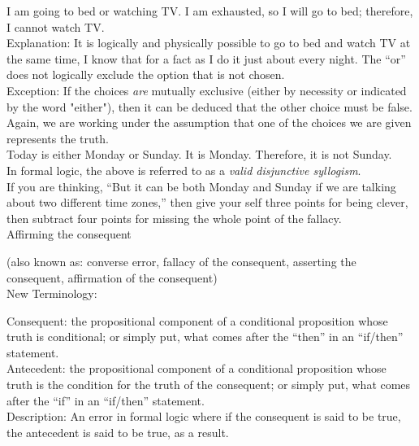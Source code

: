 \documentclass[a4paper,12pt,single,pdftex]{scrartcl}
\begin{document}
    
      I am going to bed or watching TV.  I am exhausted, so I will go to bed; therefore, I cannot watch TV.
    \\

    
      Explanation: It is logically and physically possible to go to bed and watch TV at the same time, I know that for a fact as I do it just about every night.  The “or” does not logically exclude the option that is not chosen.
    \\

    
      Exception: If the choices {\it are} mutually exclusive (either by necessity or indicated by the word "either"), then it can be deduced that the other choice must be false.  Again, we are working under the assumption that one of the choices we are given represents the truth.
    \\

    
      Today is either Monday or Sunday.  It is Monday.  Therefore, it is not Sunday.
    \\

    
      In formal logic, the above is referred to as a {\it valid disjunctive syllogism}.
    \\

    
      If you are thinking, “But it can be both Monday and Sunday if we are talking about two different time zones,” then give your self three points for being clever, then subtract four points for missing the whole point of the fallacy.
    \\

  

Affirming the consequent
    
      (also known as: converse error, fallacy of the consequent, asserting the consequent, affirmation of the consequent)
    \\

  
    New Terminology:

    
      Consequent: the propositional component of a conditional proposition whose truth is conditional; or simply put, what comes after the “then” in an “if/then” statement.
    \\

    
      Antecedent: the propositional component of a conditional proposition whose truth is the condition for the truth of the consequent; or simply put, what comes after the “if” in an “if/then” statement.
    \\

    
      Description: An error in formal logic where if the consequent is said to be true, the antecedent is said to be true, as a result.
    \\
\end{document}
